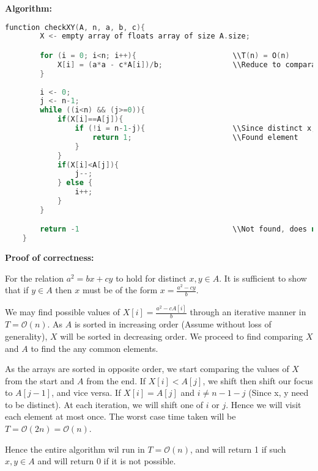 \documentclass[10pt, a4paper]{article}
\newcommand{\BigO}{\mathcal{O}}
\begin{document}
\vspace{10px}
\noindent\textbf{Algorithm:}
\begin{lstlisting}[language=c++,caption=checkXY]
    function checkXY(A, n, a, b, c){
        X <- empty array of floats array of size A.size;

        for (i = 0; i<n; i++){                      \\T(n) = O(n)
            X[i] = (a*a - c*A[i])/b;                \\Reduce to comparable form.
        }
        
        i <- 0;
        j <- n-1;
        while ((i<n) && (j>=0)){                    
            if(X[i]==A[j]){
                if (!i = n-1-j){                    \\Since distinct x,y
                    return 1;                       \\Found element 
                }     
            }
            if(X[i]<A[j]){
                j--;
            } else {
                i++;
            }
        }

        return -1                                   \\Not found, does not exist.  
    }
\end{lstlisting}

\vspace{10px}
\noindent\textbf{Proof of correctness:}

For the relation $a^2 = bx +cy$ to hold for distinct $x,y\in A$. It is sufficient to show that if $y\in A$ then $x$ must be of the form $x = \frac{a^2-cy}{b}$.

We may find possible values of $X[i] = \frac{a^2-cA[i]}{b}$ through an iterative manner in $T = \BigO(n)$. As $A$ is sorted in increasing order (Assume without loss of generality), $X$ will be sorted in decreasing order. We proceed to find comparing $X$ and $A$ to find the any common elements.

As the arrays are sorted in opposite order, we start comparing the values of $X$ from the start and $A$ from the end. If $X[i]<A[j]$, we shift then shift our focus to $A[j-1]$, and vice versa. If $X[i]=A[j]$ and $ i\neq n-1-j$ (Since x, y need to be distinct). At each iteration, we will shift one of $i$ or $j$. Hence we will visit each element at most once. The worst case time taken will be $T = \BigO(2n) = \BigO(n)$.

Hence the entire algorithm wil run in $T = \BigO(n)$, and will return 1 if such $x,y \in A$ and will return 0 if it is not possible.
\end{document}
